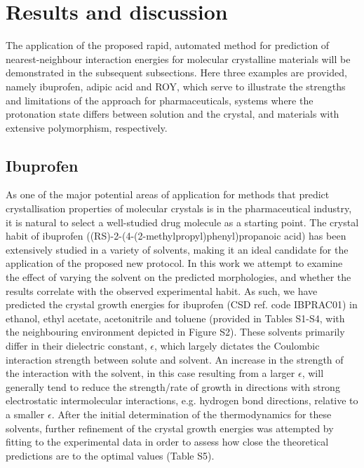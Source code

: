 \documentclass[twoside,twocolumn,9pt]{article}
\begin{document}
\section{Results and discussion}
The application of the proposed rapid, automated method for prediction of nearest-neighbour interaction energies for molecular crystalline materials will be demonstrated in the subsequent subsections. Here three examples are provided, namely ibuprofen, adipic acid and ROY, which serve to illustrate the strengths and limitations of the approach for pharmaceuticals, systems where the protonation state differs between solution and the crystal, and materials with extensive polymorphism, respectively.

\subsection{Ibuprofen}
As one of the major potential areas of application for methods that predict crystallisation properties of molecular crystals is in the pharmaceutical industry, it is natural to select a well-studied drug molecule as a starting point. 
The crystal habit of ibuprofen ((RS)-2-(4-(2-methylpropyl)phenyl)propanoic acid) has been extensively studied in a variety of solvents,\cite{Cano2001,Nguyen2017} making it an ideal candidate for the application of the proposed new protocol. In this work we attempt to examine the effect of varying the solvent on the predicted morphologies, 
and whether the results correlate with the observed experimental habit. As such, we have predicted the crystal growth energies for ibuprofen (CSD ref. code IBPRAC01) in ethanol, ethyl acetate, acetonitrile and toluene (provided in Tables S1-S4, with the neighbouring environment depicted in Figure S2). These solvents primarily differ in their dielectric constant, $\epsilon$, which largely dictates the Coulombic interaction strength 
between solute and solvent. An increase in the strength of the interaction with the solvent, in this case resulting from a larger $\epsilon$, will generally tend to reduce the strength/rate of growth in directions with strong electrostatic intermolecular interactions, e.g. hydrogen bond directions, relative to a smaller $\epsilon$. After 
the initial determination of the thermodynamics for these solvents, further refinement of the crystal growth energies was attempted by fitting to the experimental data in order to assess how close the theoretical predictions are to the optimal values (Table S5). 
\end{document}
